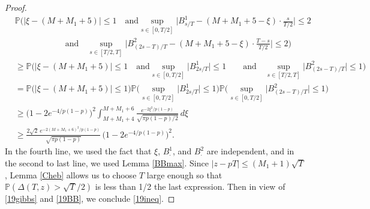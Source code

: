 \begin{proof}
\begin{align*}
	&\mathbb{P}\Big(|\xi - (M+M_1+5)|\leq 1 \quad\mathrm{and} \sup_{s\in[0,T/2]}\Big|B^1_{s/T}-(M+M_1+5-\xi)\cdot\frac{s}{T/2}\Big| \leq 2\\
	&\qquad\qquad\qquad \mathrm{and}\quad \sup_{s\in[T/2,T]}\Big|B^2_{(2s-T)/T}-(M+M_1+5-\xi)\cdot\frac{T-s}{T/2}\Big| \leq 2 \Big)\\
	&\geq \mathbb{P}\Big(|\xi - (M+M_1+5)|\leq 1 \quad\mathrm{and} \sup_{s\in[0,T/2]}\big|B^1_{2s/T}\big| \leq 1 \qquad \mathrm{and}\quad \sup_{s\in[T/2,T]}\big|B^2_{(2s-T)/T}\big| \leq 1 \Big)\\
	&= \mathbb{P}\Big(|\xi-(M+M_1+5)|\leq 1\Big)\mathbb{P}\Big(\sup_{s\in[0,T/2]} \big|B^1_{2s/T}\big|\leq 1\Big)\mathbb{P}\Big(\sup_{s\in[0,T/2]} \big|B^2_{(2s-T)/T}\big|\leq 1\Big)\\
	&\geq \big(1-2e^{-4/p(1-p)}\big)^2 \int_{M+M_1+4}^{M+M_1+6} \frac{e^{-2\xi^2/p(1-p)}}{\sqrt{\pi p(1-p)/2}}\,d\xi\\
	&\geq \frac{2\sqrt{2}\,e^{-2(M+M_1+6)^2/p(1-p)}}{\sqrt{\pi p(1-p)}}\,\big(1-2e^{-4/p(1-p)}\big)^2.
	\end{align*}
	In the fourth line, we used the fact that $\xi$, $B^1_\cdot$, and $B^2_\cdot$ are independent, and in the second to last line, we used Lemma \ref{BBmax}. Since $|z-pT|\leq (M_1+1)\sqrt{T}$, Lemma \ref{Cheb} allows us to choose $T$ large enough so that $\mathbb{P}(\Delta(T,z) > \sqrt{T}/2)$ is less than 1/2 the last expression. Then in view of \eqref{19gibbs} and \eqref{19BB}, we conclude \eqref{19ineq}.
	
\end{proof}
